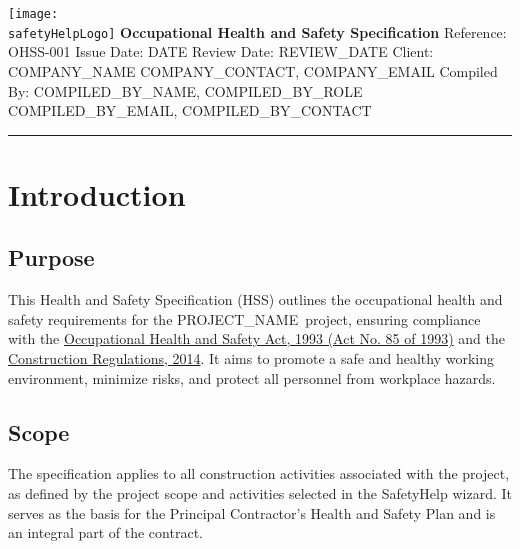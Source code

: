 \documentclass[11pt]{article}
\newcommand{\userLogo}{}
\newcommand{\userCompany}{{{COMPANY_NAME}}}
\newcommand{\safetyHelpLogo}{/safety-plans/assets/images/logo.png}
\newcommand{\docTitle}{Occupational Health and Safety Specification}
\newcommand{\refNumber}{OHSS-001}
\newcommand{\issueDate}{{{DATE}}}
\newcommand{\projectName}{{{PROJECT_NAME}}}
\newcommand{\clientName}{{{COMPANY_NAME}}}
\newcommand{\clientContact}{{{COMPANY_CONTACT}}, {{COMPANY_EMAIL}}}
\newcommand{\compilerName}{{{COMPILED_BY_NAME}}}
\newcommand{\compilerRole}{{{COMPILED_BY_ROLE}}}
\newcommand{\compilerEmail}{{{COMPILED_BY_EMAIL}}}
\newcommand{\compilerPhone}{{{COMPILED_BY_CONTACT}}}
\newcommand{\reviewDate}{{{REVIEW_DATE}}}
\begin{document}
\begin{titlepage}
  \centering
  \texttt{[image: \\safetyHelpLogo]}\hfill
  \vspace{2cm}
  \ifthen\isempty{\userLogo}{\textbf{\Large \userCompany}\vspace{1cm}}{\texttt{[image: \\userLogo]}\vspace{1cm}}
  {\Huge \textbf{\docTitle}}\vspace{1cm}
  {\Large Reference: \refNumber}\vspace{0.5cm}
  {\large Issue Date: \issueDate}\vspace{0.5cm}
  {\large Review Date: \reviewDate}\vspace{0.5cm}
  {\large Client: \clientName}\vspace{0.5cm}
  {\large \clientContact}\vspace{0.5cm}
  {\large Compiled By: \compilerName, \compilerRole}\vspace{0.5cm}
  {\large \compilerEmail, \compilerPhone}
  \vspace{2cm}
  \rule{\textwidth}{0.5pt}
\end{titlepage}

\tableofcontents
\newpage

\section{Introduction}
\subsection{Purpose}
This Health and Safety Specification (HSS) outlines the occupational health and safety requirements for the \projectName\ project, ensuring compliance with the \href{https://www.gov.za/documents/occupational-health-and-safety-act}{Occupational Health and Safety Act, 1993 (Act No. 85 of 1993)} and the \href{https://www.gov.za/documents/occupational-health-and-safety-act-construction-regulations-2014-7-feb-2014-0000}{Construction Regulations, 2014}. It aims to promote a safe and healthy working environment, minimize risks, and protect all personnel from workplace hazards.

\subsection{Scope}
The specification applies to all construction activities associated with the project, as defined by the project scope and activities selected in the SafetyHelp wizard. It serves as the basis for the Principal Contractor’s Health and Safety Plan and is an integral part of the contract.
\end{document}
